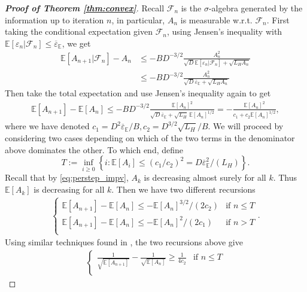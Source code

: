 \documentclass[11pt]{amsart}
\theoremstyle{plain}
\theoremstyle{definition}
\theoremstyle{remark}
\def\E{\mathbb{E}}
\def\eps{\varepsilon}
\newcommand{\commHL}[1]{{\textcolor{blue}{#1}}}
\begin{document}
\begin{proof}[\textbf{Proof of Theorem \ref{thm:convex}}]
    
   Recall $\mathcal{F}_{n}$ is the $\sigma$-algebra generated by the information up to iteration $n$, in particular, $A_n$ is measurable w.r.t. $\mathcal{F}_{n}$. First taking the conditional expectation given $\mathcal{F}_{n}$, using Jensen's inequality with $\E[\eps_{n}|\mathcal{F}_n]\le \overline{\eps}_{\E}$, we get 
   \begin{align*}
       \E[A_{n+1}|\mathcal{F}_n]-A_n&\leq -BD^{-3/2}\frac{A_n^2}{\sqrt{D}\E[\eps_n|\mathcal{F}_n]+\sqrt{L_HA_n}}\\
       &\le -BD^{-3/2}\frac{A_n^2}{\sqrt{D}\overline{\eps}_{\E}+\sqrt{L_HA_n}}
   \end{align*}
   {\color{orange}}
   Then take the total expectation and use Jensen's inequality again to get 
	\begin{align*}
	\E[A_{n+1}]-\E[A_{n}]  \le  -BD^{-3/2}\frac{\E[A_{n}]^{2}}{\sqrt{D}\overline{\eps}_{\E} +\sqrt{L_{H}}  \, \E[A_{n}]^{1/2}}=-\frac{\E[A_n]^2}{c_1+c_2\E[A_n]^{1/2}},
	\end{align*}
    where we have denoted $ c_1=D^2\overline{\eps}_{\E}/B,
         c_2=D^{3/2}\sqrt{L_H}/B.$
    We will proceed by considering two cases depending on which of the two terms in the denominator above dominates the other. To which end, define
    \[
    T:=\inf_{i\geq 0 }\left\{i:\E[A_i]\leq (c_1/c_2)^2=D\overline{\eps}_{\E}^2/(L_H)\right\}.
    \]
    Recall that by \eqref{eq:perstep_impv}, $A_{k}$ is decreasing almost surely for all $k$. Thus $\E[A_k]$ is decreasing for all $k.$
    Then we have two different recursions
    \begin{align*}
    \begin{cases}
        \E[A_{n+1}]-\E[A_n]\leq -\E[A_n]^{3/2}/(2c_2) & \text{if } n\leq T\\
        \E[A_{n+1}]-\E[A_{n}]\leq -\E[A_{n}]^{2}/(2c_1) & \text{if } n> T\\
    \end{cases}.    
    \end{align*}
    Using similar techniques found in \cite{nesterov2006cubic,mishchenko2023regularized}, the two recursions above give
    \begin{align*}
    \begin{cases}
        \displaystyle\frac{1}{\sqrt{\E[A_{n+1}]}}-\frac{1}{\sqrt{\E[A_{n}]}}\geq \frac{1}{4c_2} & \text{if } n\leq T\\

\end{cases}
\end{align*}
\end{proof}
\end{document}
